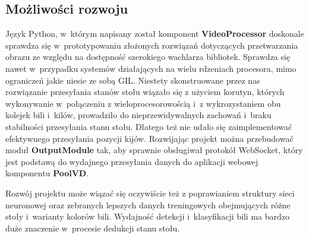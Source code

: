 \documentclass[12pt]{article}
\begin{document}
\subsection{Możliwości rozwoju}

Język Python, w~którym napisany został komponent \textbf{VideoProcessor} doskonale sprawdza się w~prototypowaniu złożonych rozwiązań dotyczących przetwarzania obrazu ze względu na dostępność szerokiego wachlarza bibliotek. Sprawdza się nawet w~przypadku systemów działających na wielu rdzeniach procesora, mimo ograniczeń jakie niesie ze sobą GIL\cite{gil}. Niestety skonstruowane przez nas rozwiązanie przesyłania stanów stołu wiązało się z użyciem korutyn, których wykonywanie w~połączeniu z wieloprocesorowością i~z wykrozystaniem obu kolejek bili i~kilów, prowadziło do nieprzewidywalnych zachowań i~braku stabilności przesyłania stanu stołu. Dlatego też nie udało się zaimplementować efektywnego przesyłania pozycji kijów. Rozwijając projekt można przebudować moduł \textbf{OutputModule} tak, aby sprawnie obsługiwał protokół WebSocket, który jest podstawą do wydajnego przesyłania danych do aplikacji webowej komponentu \textbf{PoolVD}.

Rozwój projektu może wiązać się oczywiście też z poprawianiem struktury sieci neuronowej oraz zebranych lepszych danych treningowych obejmujących różne stoły i~warianty kolorów bili. Wydajność detekcji i~klasyfikacji bili ma bardzo duże znaczenie w~procesie dedukcji stanu stołu.

\clearpage
\newpage

\printbibliography
\end{document}
